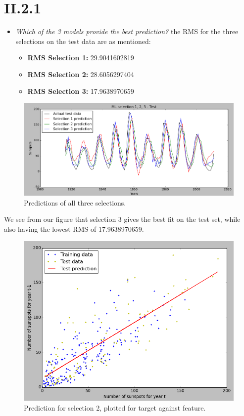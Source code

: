 \documentclass[12pt, a4paper]{article}
\begin{document}
\section{II.2.1}
\begin{itemize}
\item \textit{Which of the 3 models provide the best prediction?} 
the RMS for the three selections on the test data are as mentioned:
		\begin{itemize}
		\item \textbf{RMS Selection 1:} 29.9041602819
		\item \textbf{RMS Selection 2:} 28.6056297404
		\item \textbf{RMS Selection 3:} 17.9638970659
	\end{itemize}
\end{itemize}

\begin{figure}[H]
	\includegraphics[scale=0.475]{ML_predictions.png}
	\caption{Predictions of all three selections.}
\end{figure}

We see from our figure that selection 3 gives the best fit on the test set, while also having the lowest RMS of 17.9638970659.

\begin{figure}[H]
	\includegraphics[scale=0.665]{ML_regression.png}
	\caption{Prediction for selection 2, plotted for target against feature.}
\end{figure}
\end{document}
